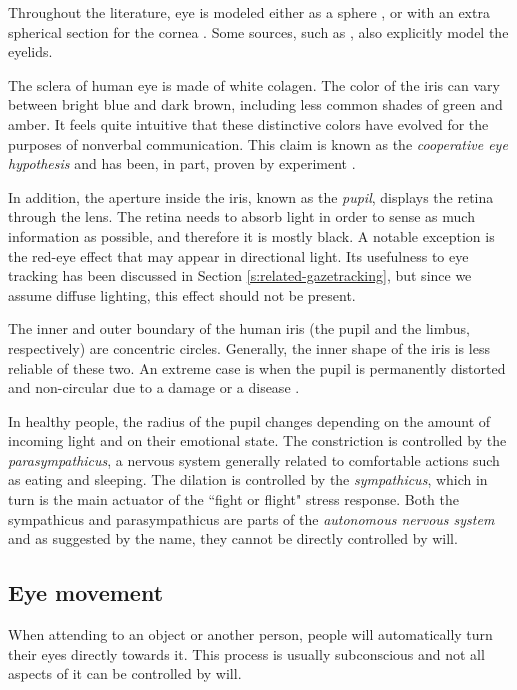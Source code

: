 Throughout the literature, eye is modeled either as a sphere \cite{zhang13}, or with an extra spherical section for the cornea \cite{villanueva08}.
Some sources, such as \cite{wang16}, also explicitly model the eyelids.

The sclera of human eye is made of white colagen.
The color of the iris can vary between bright blue and dark brown, including less common shades of green and amber.
It feels quite intuitive that these distinctive colors have evolved for the purposes of nonverbal communication.
This claim is known as the \textit{cooperative eye hypothesis} and has been, in part, proven by experiment \cite{tomasello07}.

In addition, the aperture inside the iris, known as the \textit{pupil}, displays the retina through the lens.
The retina needs to absorb light in order to sense as much information as possible, and therefore it is mostly black.
A notable exception is the red-eye effect that may appear in directional light.
Its usefulness to eye tracking has been discussed in Section \ref{s:related-gazetracking}, but since we assume diffuse lighting, this effect should not be present.

The inner and outer boundary of the human iris (the pupil and the limbus, respectively) are concentric circles.
Generally, the inner shape of the iris is less reliable of these two.
An extreme case is when the pupil is permanently distorted and non-circular due to a damage \cite[p.5]{bowyer16} or a disease \cite[p.146]{bowyer16}.

In healthy people, the radius of the pupil changes depending on the amount of incoming light and on their emotional state.
The constriction is controlled by the \textit{parasympathicus}, a nervous system generally related to comfortable actions such as eating and sleeping.
The dilation is controlled by the \textit{sympathicus}, which in turn is the main actuator of the ``fight or flight" stress response.
Both the sympathicus and parasympathicus are parts of the \textit{autonomous nervous system} and as suggested by the name, they cannot be directly controlled by will.

\subsection{Eye movement}

When attending to an object or another person, people will automatically turn their eyes directly towards it.
This process is usually subconscious and not all aspects of it can be controlled by will.

